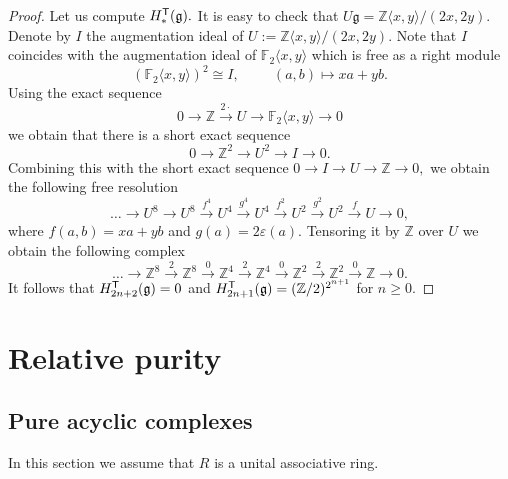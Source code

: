 \documentclass{amsart}
\numberwithin{equation}{section}
\theoremstyle{definition}
\def\gg{\mathfrak{g}}
\def\ZZ{\mathbb{Z}}
\begin{document}
\begin{proof}
Let us compute $H_*^{\sf T}(\gg).$ It is easy to check that $U \gg=\ZZ\langle x,y \rangle/(2x,2y).$ Denote by $I$ the augmentation ideal of $U:=\ZZ\langle x,y \rangle/(2x,2y).$ Note that $I$ coincides with the augmentation ideal of $\mathbb F_2\langle x,y \rangle$ which is free as a right module
$$(\mathbb F_2\langle x,y \rangle)^2\cong I, \hspace{1cm} (a,b)\mapsto xa+yb.$$ 
Using the exact sequence 
$$ 0 \longrightarrow \ZZ \overset{2\cdot }\longrightarrow  U \longrightarrow  \mathbb F_2\langle x,y \rangle \longrightarrow 0$$
we obtain that there is a short exact sequence
$$0 \longrightarrow \ZZ^2 \longrightarrow  U^2 \longrightarrow  I \longrightarrow 0.$$
Combining this with the short exact sequence $0\to I \to U \to \ZZ\to 0,$ we obtain the following free resolution 
$$\dots \to U^8 \to  U^8 \overset{f^4}\to U^4 \overset{g^4}\to U^4 \overset{f^2}\to U^2 \overset{g^2}\to U^2 \overset{f}\to U \to 0,$$
where $f(a,b)=xa+yb$ and $g(a)=2\varepsilon(a).$ Tensoring it by $\ZZ$ over $U$ we obtain the following complex
$$ \dots \to \ZZ^8 \overset{2}\to  \ZZ^8 \overset{0}\to \ZZ^4 \overset{2}\to \ZZ^4 \overset{0}\to \ZZ^2 \overset{2}\to \ZZ^2 \overset{0}\to \ZZ \to 0.$$
It follows that $H_{2n+2}^{\sf T}(\gg)=0$ and $H_{2n+1}^{\sf T}(\gg)=(\ZZ/2)^{2^{n+1}}$ for $n\geq 0.$
\end{proof}




\section{Relative purity}

\subsection{Pure acyclic complexes}

In this section we assume that $R$ is a unital associative ring. 
\end{document}
